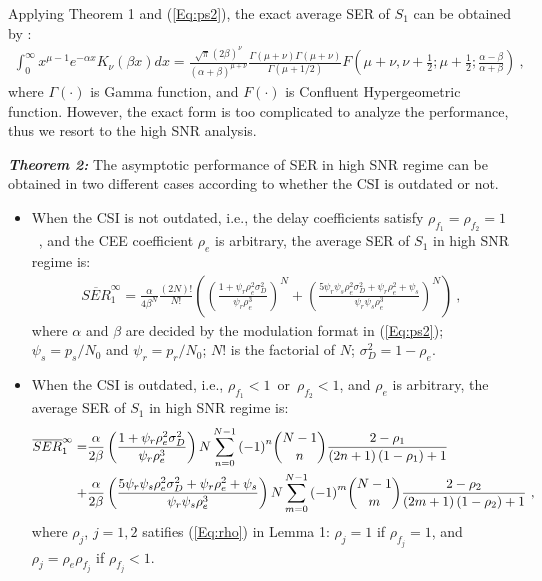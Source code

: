 \documentclass[onecolumn,letterpaper,11pt,draftclsnofoot]{IEEEtran}
\begin{document}
Applying Theorem 1 and (\ref{Eq:ps2}), the exact average SER of
$S_1$ can be obtained by \cite[(6.621.3)]{Gradshteyn94}:
\begin{align}
\int_0^\infty {x^{\mu  - 1} } e^{ - \alpha x} K_\nu  \left(\beta
x\right)dx = \frac{{\sqrt \pi \left(2\beta \right)^\nu
}}{{\left(\alpha  + \beta \right)^{\mu + \nu } }}\frac{{\Gamma
\left(\mu  + \nu \right)\Gamma \left(\mu  + \nu \right)}}{{\Gamma
\left(\mu + 1/2\right)}}F\left(\mu  + \nu ,\nu + \frac{1}{2};\mu +
\frac{1}{2};\frac{{\alpha  - \beta }}{{\alpha + \beta }}\right)~,
\end{align}
where $\Gamma\left(\cdot\right)$ is Gamma function, and
$F\left(\cdot\right)$ is Confluent Hypergeometric
function\cite{Abramowitz}. However, the exact form is too
complicated to analyze the performance, thus we resort to the high
SNR analysis\cite{Zheng2003}.





\emph{\textbf{Theorem 2:}} The asymptotic performance of SER in high
SNR regime can be obtained in two different cases according to
whether the CSI is outdated or not.


\begin{itemize}
  \item When the CSI is not outdated, i.e., the delay coefficients satisfy
$\rho_{f_1}=\rho_{f_2} =1$~, and the CEE coefficient $\rho_e$ is
arbitrary, the average SER of $S_1$ in high SNR regime is:
\begin{align}\label{Eq:SER11}
\overline {SER}_1^\infty   = \frac{\alpha }{{4\beta ^N
}}\frac{{\left(2N\right)!}}{{N!}}\left(\left(\frac{{1 + \psi _r \rho
_e^2 \sigma _D^2 }}{{\psi _r \rho _e^3 }}\right)^N  +
\left(\frac{{5\psi _r \psi _s \rho _e^2 \sigma _D^2  + \psi _r \rho
_e^2 + \psi _s }}{{\psi _r \psi _s \rho _e^3 }}\right)^N \right)~,
\end{align}
where $\alpha$ and $\beta$ are decided by the modulation format in
(\ref{Eq:ps2}); $\psi_s=p_s/N_0$ and $\psi_r=p_r/N_0$; $N!$ is the
factorial of $N$; $\sigma_D^2=1-\rho_e$.

  \item When the CSI is outdated, i.e., $ \rho _{f_1} < 1$~or~$\rho_{f_2}
<1$, and $\rho_e$ is arbitrary, the average SER of $S_1$ in high SNR
regime is:
\begin{align}\label{Eq:SER12}
\overline {SER}_1^\infty = &\frac{\alpha }{{2\beta }}\left(\frac{{1
+ \psi _r \rho _e^2 \sigma _D^2 }}{{\psi _r \rho _e^3
}}\right)N\sum\limits_{n = 0}^{N - 1} {\left( - 1\right)^n }
\binom{N-1}{n}\frac{{2 - \rho _1 }}{{\left(2n + 1\right)\left(1 -
\rho _1 \right) + 1}} \\\notag+ &\frac{\alpha }{{2\beta
}}\left(\frac{{5\psi _r \psi _s \rho _e^2 \sigma _D^2  + \psi _r
\rho _e^2 + \psi _s }}{{\psi _r \psi _s \rho _e^3
}}\right)N\sum\limits_{m = 0}^{N - 1} {\left( - 1\right)^m }
\binom{N-1}{m}\frac{{2 -\rho _2 }}{{\left(2m+ 1\right)\left(1 - \rho
_2 \right) +1}}~,
\end{align}
where $\rho_j$, $j=1,2$ satifies (\ref{Eq:rho}) in Lemma 1:
$\rho_j=1$ if $\rho_{f_j}=1$, and $\rho_j=\rho_e\rho_{f_j}$ if
$\rho_{f_j}<1$.
\end{itemize}
\end{document}
